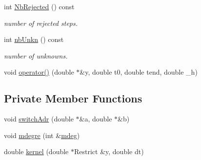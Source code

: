 \begin{DoxyCompactItemize}
int \hyperlink{classodes_1_1Rock4_ae7d80ce26137d193b7abc700cadf4482}{Nb\-Rejected} () const 
\begin{DoxyCompactList}\small\item\em number of rejected steps. \end{DoxyCompactList}\item 
int \hyperlink{classodes_1_1Rock4_af959e5bca4464f383f1fe53d782ffe67}{nb\-Unkn} () const 
\begin{DoxyCompactList}\small\item\em number of unknowns. \end{DoxyCompactList}\item 
void \hyperlink{classodes_1_1Rock4_aa08734fa31ff484abd64e9154e87f330}{operator()} (double $\ast$\&y, double t0, double tend, double \-\_\-h)
\end{DoxyCompactItemize}
\subsection*{Private Member Functions}
\begin{DoxyCompactItemize}
\item 
void \hyperlink{classodes_1_1Rock4_a5a1eff4484f4a37692f3c71ca0077442}{switch\-Adr} (double $\ast$\&a, double $\ast$\&b)
\item 
void \hyperlink{classodes_1_1Rock4_aed2802f697e7c5802cbf56c37b418337}{mdegre} (int \&\hyperlink{classodes_1_1Rock4_a80db44ee8d908fcb96ca4d6075a46ee4}{mdeg})
\item 
double \hyperlink{classodes_1_1Rock4_aaf3121b5489bfc0067f8b8852bada59f}{kernel} (double $\ast$Restrict \&y, double dt)
\end{DoxyCompactItemize}
